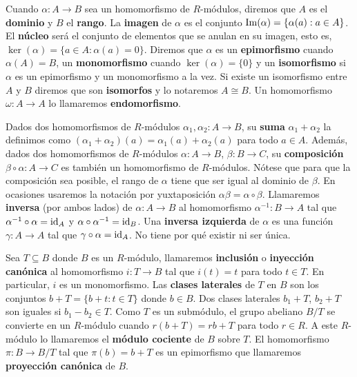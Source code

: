 Cuando $\alpha: A \rightarrow B$ sea un homomorfismo de $R$-módulos, diremos que $A$ es el \textbf{dominio} y $B$ el \textbf{rango}. La \textbf{imagen} de $\alpha$ es el conjunto $\operatorname{Im}(\alpha) = \{ \alpha(a) : a \in A \}$. El \textbf{núcleo} será el conjunto de elementos que se anulan en su imagen, esto es, $\ker(\alpha) = \{ a \in A : \alpha(a) = 0 \}$. Diremos que $\alpha$ es un \textbf{epimorfismo} cuando $\alpha(A) = B$, un \textbf{monomorfismo} cuando $\ker(\alpha) = \{0\}$ y un \textbf{isomorfismo} si $\alpha$ es un epimorfismo y un monomorfismo a la vez. Si existe un isomorfismo entre $A$ y $B$ diremos que son \textbf{isomorfos} y lo notaremos $A \cong B$. Un homomorfismo $\omega: A \rightarrow A$ lo llamaremos \textbf{endomorfismo}.

Dados dos homomorfismos de $R$-módulos $\alpha_1, \alpha_2 : A \rightarrow B$, su \textbf{suma} $\alpha_1 + \alpha_2$ la definimos como $(\alpha_1 + \alpha_2)(a) = \alpha_1(a) + \alpha_2(a)$ para todo $a \in A$. Además, dados dos homomorfismos de $R$-módulos $\alpha: A \rightarrow B$, $\beta: B \rightarrow C$, su \textbf{composición} $\beta \circ \alpha: A \rightarrow C$ es también un homomorfismo de $R$-módulos. Nótese que para que la composición sea posible, el rango de $\alpha$ tiene que ser igual al dominio de $\beta$. En ocasiones usaremos la notación por yuxtaposición $\alpha\beta = \alpha \circ \beta$. Llamaremos \textbf{inversa} (por ambos lados) de $\alpha : A \rightarrow B$ al homomorfismo $\alpha^{-1} : B \rightarrow A$ tal que $\alpha^{-1} \circ \alpha = \operatorname{id}_A$ y $\alpha \circ \alpha^{-1} = \operatorname{id}_B$. Una \textbf{inversa izquierda} de $\alpha$ es una función $\gamma: A \rightarrow A$ tal que $\gamma \circ \alpha = \operatorname{id}_A$. No tiene por qué existir ni ser única.

Sea \(T \subseteq B\) donde $B$ es un $R$-módulo, llamaremos \textbf{inclusión} o \textbf{inyección canónica} al homomorfismo $i: T \rightarrow B$ tal que $i(t) = t$ para todo $t \in T$. En particular, $i$ es un monomorfismo. Las \textbf{clases laterales} de $T$ en $B$ son los conjuntos $b + T = \{b + t : t \in T\}$ donde $b \in B$. Dos clases laterales $b_1 + T$, $b_2 + T$ son iguales si $b_1 - b_2 \in T$. Como $T$ es un submódulo, el grupo abeliano $B/T$ se convierte en un $R$-módulo cuando $r(b+T) = rb + T$ para todo $r \in R$. A este $R$-módulo lo llamaremos el \textbf{módulo cociente} de $B$ sobre $T$. El homomorfismo $\pi: B \rightarrow B/T$ tal que $\pi(b) = b + T$ es un epimorfismo que llamaremos \textbf{proyección canónica} de $B$.


